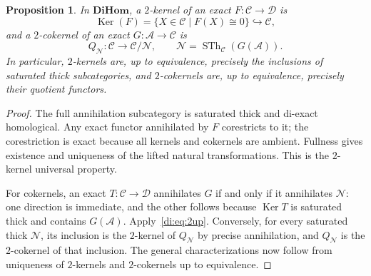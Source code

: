 \documentclass[11pt,reqno,a4paper]{amsart}
\newtheorem{proposition}[theorem]{Proposition}
\theoremstyle{definition}
\theoremstyle{remark}
\newcommand{\C}{\mathcal{C}}
\newcommand{\D}{\mathcal{D}}
\newcommand{\N}{\mathcal{N}}
\newcommand{\0}{\mathbf{0}}
\renewcommand{\1}{\mathbf{1}}
\newcommand{\DiHom}{\mathbf{DiHom}}
\DeclareMathOperator{\Ker}{Ker}
\DeclareMathOperator{\SatTh}{STh}
\begin{document}
\begin{proposition}\label{di:prop:2kc}
In $\DiHom$, a $2$-kernel of an exact $F:\C\to\D$ is
\[
 \Ker(F)=\{X\in\C\mid F(X)\cong0\}\hookrightarrow\C,
\]
and a $2$-cokernel of an exact $G:\mathcal A\to\C$ is
\[
 Q_{\N}:\C\longrightarrow\C/\N,
 \qquad\N=\SatTh_{\C}(G(\mathcal A)).
\]
In particular, $2$-kernels are, up to equivalence, precisely the inclusions of saturated thick subcategories, and $2$-cokernels are, up to equivalence, precisely their quotient functors.
\end{proposition}
\begin{proof}
The full annihilation subcategory is saturated thick and di-exact homological. Any exact functor annihilated by $F$ corestricts to it; the corestriction is exact because all kernels and cokernels are ambient. Fullness gives existence and uniqueness of the lifted natural transformations. This is the $2$-kernel universal property.

For cokernels, an exact $T:\C\to\D$ annihilates $G$ if and only if it annihilates $\N$: one direction is immediate, and the other follows because $\Ker T$ is saturated thick and contains $G(\mathcal A)$. Apply~\eqref{di:eq:2up}. Conversely, for every saturated thick $\N$, its inclusion is the $2$-kernel of $Q_{\N}$ by precise annihilation, and $Q_{\N}$ is the $2$-cokernel of that inclusion. The general characterizations now follow from uniqueness of $2$-kernels and $2$-cokernels up to equivalence.
\end{proof}
\end{document}
